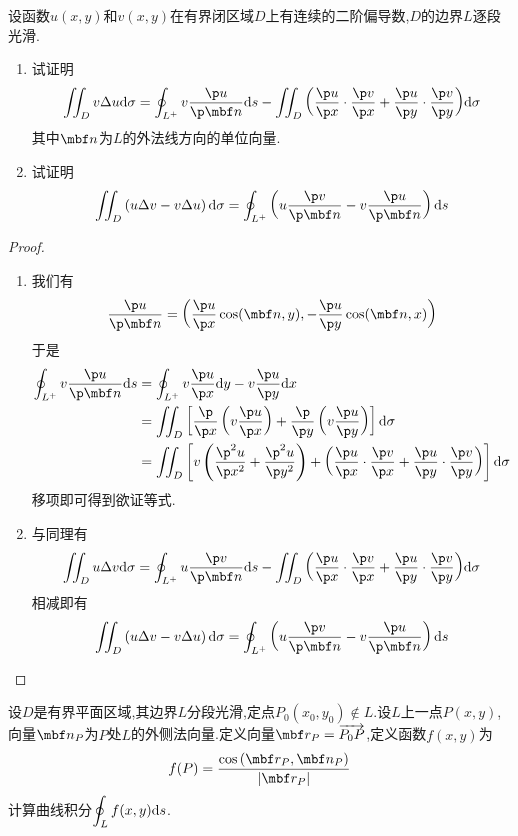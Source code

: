 \documentclass{ctexart}
\begin{document}
\begin{problem}[C.3]
    设函数$u(x,y)$和$v(x,y)$在有界闭区域$D$上有连续的二阶偏导数,$D$的边界$L$逐段光滑.
    \begin{enumerate}[label=\tbf{(\arabic*)}]
        \item 试证明
            \[\iint_{D}v\Delta u\di\sigma=\oint_{L^+}v\dfrac{\p u}{\p\mbf n}\di s-\iint_D{\left(\dfrac{\p u}{\p x}\cdot\dfrac{\p v}{\p x}+\dfrac{\p u}{\p y}\cdot\dfrac{\p v}{\p y}\right)}\di\sigma\]
            其中$\mbf n$为$L$的外法线方向的单位向量.
        \item 试证明
            \[\iint_{D}\left(u\Delta v-v\Delta u\right)\di\sigma=\oint_{L^+}\left(u\dfrac{\p v}{\p\mbf n}-v\dfrac{\p u}{\p\mbf n}\right)\di s\]
    \end{enumerate}
\end{problem}
\begin{proof}
    \begin{enumerate}[label=\tbf{(\arabic*)}]
        \item 我们有
            \[\dfrac{\p u}{\p\mbf n}=\left(\dfrac{\p u}{\p x}\cos(\mbf n,y),-\dfrac{\p u}{\p y}\cos(\mbf n,x)\right)\]
            于是
            \[\begin{aligned}
                \oint_{L^+}v\dfrac{\p u}{\p\mbf n}\di s
                &= \oint_{L^+}v\dfrac{\p u}{\p x}\di y-v\dfrac{\p u}{\p y}\di x \\
                &= \iint_D\left[\dfrac{\p}{\p x}\left(v\dfrac{\p u}{\p x}\right)+\dfrac{\p}{\p y}\left(v\dfrac{\p u}{\p y}\right)\right]\di\sigma \\
                &= \iint_D\left[v\left(\dfrac{\p^2u}{\p x^2}+\dfrac{\p^2u}{\p y^2}\right)+\left(\dfrac{\p u}{\p x}\cdot\dfrac{\p v}{\p x}+\dfrac{\p u}{\p y}\cdot\dfrac{\p v}{\p y}\right)\right]\di\sigma
            \end{aligned}\]
            移项即可得到欲证等式.
        \item 与同理有
            \[\iint_{D}u\Delta v\di\sigma=\oint_{L^+}u\dfrac{\p v}{\p\mbf n}\di s-\iint_D{\left(\dfrac{\p u}{\p x}\cdot\dfrac{\p v}{\p x}+\dfrac{\p u}{\p y}\cdot\dfrac{\p v}{\p y}\right)}\di\sigma\]
            相减即有
            \[\iint_{D}\left(u\Delta v-v\Delta u\right)\di\sigma=\oint_{L^+}\left(u\dfrac{\p v}{\p\mbf n}-v\dfrac{\p u}{\p\mbf n}\right)\di s\]
    \end{enumerate}
\end{proof}
\begin{problem}[C.4]
    设$D$是有界平面区域,其边界$L$分段光滑,定点$P_0(x_0,y_0)\notin L$.设$L$上一点$P(x,y)$,%
    向量${\mbf n}_P$为$P$处$L$的外侧法向量.定义向量$\mbf r_P=\overrightarrow{P_0P}$,定义函数$f(x,y)$为
    \[f(P)=\dfrac{\cos\left(\mbf r_P,\mbf n_P\right)}{|\mbf r_P|}\]
    计算曲线积分$\displaystyle\oint_{L}f(x,y)\mathrm{d} s$.
\end{problem}
\end{document}
